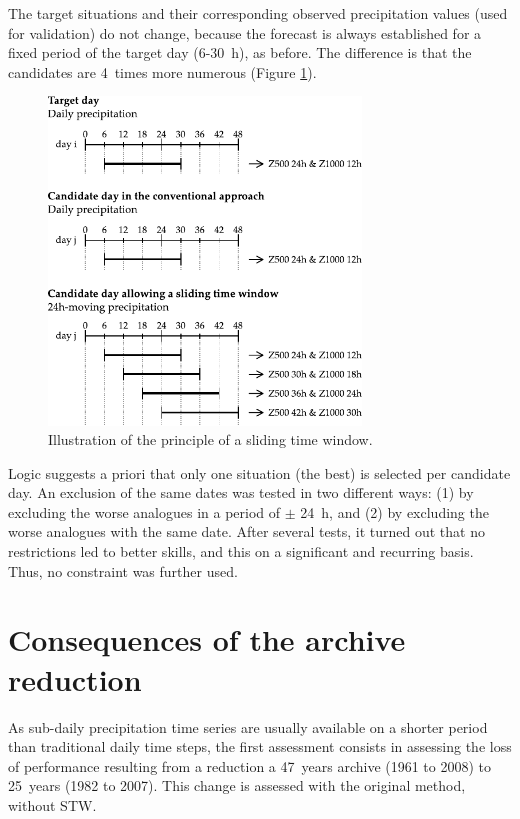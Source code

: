 \documentclass[hess]{copernicus}
\begin{document}
The target situations and their corresponding observed precipitation values (used for validation) do not change, because the forecast is always established for a fixed period of the target day (6-30~h), as before. The difference is that the candidates are 4~times more numerous (Figure \ref{fig:principle}).

\begin{figure}[htb]
	\begin{center}
		\includegraphics[width=8.3cm]{figures/illustration_moving_window.pdf}
	\end{center}
	\caption{Illustration of the principle of a sliding time window. }
	\label{fig:principle}
\end{figure}

Logic suggests a priori that only one situation (the best) is selected per candidate day. An exclusion of the same dates was tested in two different ways: (1)
by excluding the worse analogues in a period of $\pm$ 24~h, and (2) by excluding the worse analogues with the same date. After several tests, it turned out that no restrictions led to better skills, and this on a significant and recurring basis. Thus, no constraint was further used.


\section{Consequences of the archive reduction}

As sub-daily precipitation time series are usually available on a shorter period than traditional daily time steps, the first assessment consists in assessing the loss of performance resulting from a reduction a 47~years archive (1961 to 2008) to 25~years (1982 to 2007). This change is assessed with the original method, without STW.
\end{document}
